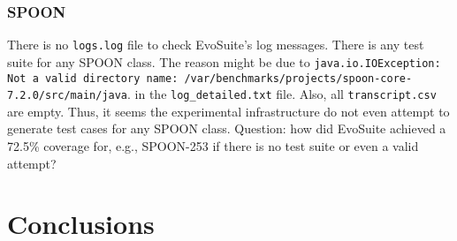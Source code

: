 \documentclass[sigconf]{acmart}
\newcommand{\EVOSUITE}{{\sc EvoSuite}\xspace}
\begin{document}

\subsubsection*{SPOON} There is no \texttt{logs.log} file to check \EVOSUITE's
log messages.  There is any test suite for any SPOON
class.  The reason might be due to
\texttt{java.io.IOException: Not a valid directory name: /var/benchmarks/projects/spoon-core-7.2.0/src/main/java}.
in the \texttt{log\_detailed.txt} file.  Also, all \texttt{transcript.csv} are
empty.  Thus, it seems the experimental infrastructure do not even attempt to
generate test cases for any SPOON class.  Question: how did \EVOSUITE achieved
a 72.5\% coverage for, e.g., SPOON-253 if there is no test suite or even a valid
attempt?


\section{Conclusions}



\end{document}
